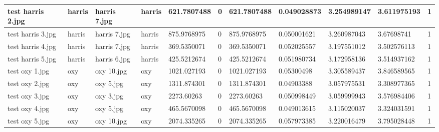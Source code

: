 \begin{landscape}
\begin{longtable}{|p{2cm}|p{1.5cm}|p{2cm}|p{1.5cm}|p{2cm}|p{1cm}|p{2cm}|p{2cm}|p{2cm}|p{2cm}|p{1cm}|}
		test harris 2.jpg    & harris           & harris 7.jpg          & harris                      & 621.7807488           & 0                       & 621.7807488                & 0.049028873           & 3.254989147           & 3.611975193              & 1                \\ \hline
		test harris 3.jpg    & harris           & harris 7.jpg          & harris                      & 875.9768975           & 0                       & 875.9768975                & 0.050001621           & 3.260987043           & 3.67698741               & 1                \\ \hline
		test harris 4.jpg    & harris           & harris 7.jpg          & harris                      & 369.5350071           & 0                       & 369.5350071                & 0.052025557           & 3.197551012           & 3.502576113              & 1                \\ \hline
		test harris 5.jpg    & harris           & harris 6.jpg          & harris                      & 425.5212674           & 0                       & 425.5212674                & 0.051980734           & 3.172958136           & 3.514937162              & 1                \\ \hline
		test oxy 1.jpg       & oxy              & oxy 10.jpg            & oxy                         & 1021.027193           & 0                       & 1021.027193                & 0.05300498            & 3.305589437           & 3.846589565              & 1                \\ \hline
		test oxy 2.jpg       & oxy              & oxy 5.jpg             & oxy                         & 1311.874301           & 0                       & 1311.874301                & 0.04903388            & 3.057975531           & 3.308977365              & 1                \\ \hline
		test oxy 3.jpg       & oxy              & oxy 3.jpg             & oxy                         & 2273.60263            & 0                       & 2273.60263                 & 0.050998449           & 3.059999943           & 3.576984406              & 1                \\ \hline
		test oxy 4.jpg       & oxy              & oxy 5.jpg             & oxy                         & 465.5670098           & 0                       & 465.5670098                & 0.049013615           & 3.115020037           & 3.324031591              & 1                \\ \hline
		test oxy 5.jpg       & oxy              & oxy 10.jpg            & oxy                         & 2074.335265           & 0                       & 2074.335265                & 0.057973385           & 3.220016479           & 3.795028448              & 1                \\ \hline

\end{longtable}
\end{landscape}
